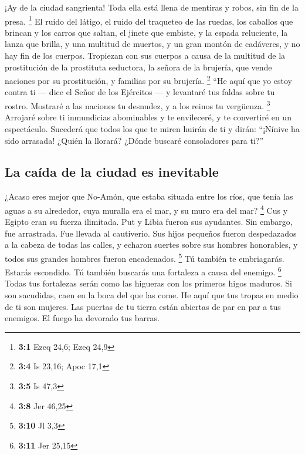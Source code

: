 \begin{paracol}{2}
 ¡Ay de la ciudad sangrienta! Toda ella está llena de
mentiras y robos, sin fin de la presa. \footnote{\textbf{3:1} Ezeq 24,6;
  Ezeq 24,9}  El ruido del látigo, el ruido del traqueteo
de las ruedas, los caballos que brincan y los carros que saltan,
 el jinete que embiste, y la espada reluciente, la lanza
que brilla, y una multitud de muertos, y un gran montón de cadáveres, y
no hay fin de los cuerpos. Tropiezan con sus cuerpos  a
causa de la multitud de la prostitución de la prostituta seductora, la
señora de la brujería, que vende naciones por su prostitución, y
familias por su brujería. \footnote{\textbf{3:4} Is 23,16; Apoc 17,1}
 ``He aquí que yo estoy contra ti --- dice el Señor de los
Ejércitos --- y levantaré tus faldas sobre tu rostro. Mostraré a las
naciones tu desnudez, y a los reinos tu vergüenza. \footnote{\textbf{3:5}
  Is 47,3}  Arrojaré sobre ti inmundicias abominables y te
envileceré, y te convertiré en un espectáculo.  Sucederá
que todos los que te miren huirán de ti y dirán: ``¡Nínive ha sido
arrasada! ¿Quién la llorará? ¿Dónde buscaré consoladores para ti?''

\hypertarget{la-cauxedda-de-la-ciudad-es-inevitable}{%
\subsection{La caída de la ciudad es
inevitable}\label{la-cauxedda-de-la-ciudad-es-inevitable}}

 ¿Acaso eres mejor que No-Amón, que estaba situada entre
los ríos, que tenía las aguas a su alrededor, cuya muralla era el mar, y
su muro era del mar? \footnote{\textbf{3:8} Jer 46,25} 
Cus y Egipto eran su fuerza ilimitada. Put y Libia fueron sus ayudantes.
 Sin embargo, fue arrastrada. Fue llevada al cautiverio.
Sus hijos pequeños fueron despedazados a la cabeza de todas las calles,
y echaron suertes sobre sus hombres honorables, y todos sus grandes
hombres fueron encadenados. \footnote{\textbf{3:10} Jl 3,3}
 Tú también te embriagarás. Estarás escondido. Tú también
buscarás una fortaleza a causa del enemigo. \footnote{\textbf{3:11} Jer
  25,15}  Todas tus fortalezas serán como las higueras
con los primeros higos maduros. Si son sacudidas, caen en la boca del
que las come.  He aquí que tus tropas en medio de ti son
mujeres. Las puertas de tu tierra están abiertas de par en par a tus
enemigos. El fuego ha devorado tus barras.


\end{paracol}
